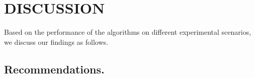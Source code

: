 \documentclass[sigconf, nonacm]{acmart}
\begin{document}
{	
	\section{DISCUSSION}
	Based on the performance of the algorithms on different experimental scenarios, we discuss our findings as follows.
	
	
	\subsection{Recommendations.}
	
}
\end{document}
